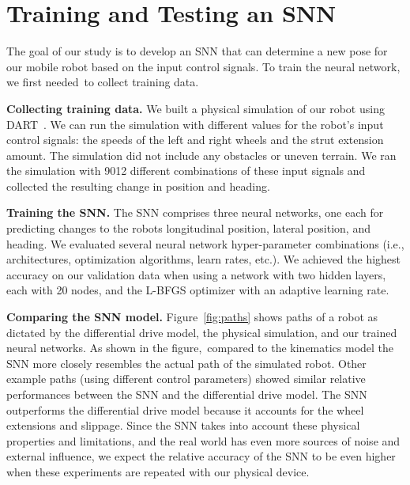 
\section{Training and Testing an SNN}

The goal of our study is to develop an SNN that can determine a new pose for our mobile robot based on the input control signals. To train the neural network, we first needed to collect training data.

\noindent
\textbf{Collecting training data.}
%
We built a physical simulation of our robot using DART~\citep{Lee.2018.JOSS.DARTDynamicAnimation}.
%
We can run the simulation with different values for the robot’s input control signals: the speeds of the left and right wheels and the strut extension amount. The simulation did not include any obstacles or uneven terrain.
%
We ran the simulation with 9012 different combinations of these input signals and collected the resulting change in position and heading.

\noindent
\textbf{Training the SNN.}
%
The SNN comprises three neural networks, one each for predicting changes to the robots longitudinal position, lateral position, and heading.
%
We evaluated several neural network hyper-parameter combinations (i.e., architectures, optimization algorithms, learn rates, etc.). We achieved the highest accuracy on our validation data when using a network with two hidden layers, each with 20 nodes, and the L-BFGS optimizer with an adaptive learning rate.

\noindent
\textbf{Comparing the SNN model.} Figure~\ref{fig:paths} shows paths of a robot as dictated by the differential drive model, the physical simulation, and our trained neural networks.
%
As shown in the figure, compared to the kinematics model the SNN more closely resembles the actual path of the simulated robot.
%
Other example paths (using different control parameters) showed similar relative performances between the SNN and the differential drive model.
%
The SNN outperforms the differential drive model because it accounts for the wheel extensions and slippage.
%
Since the SNN takes into account these physical properties and limitations, and the real world has even more sources of noise and external influence, we expect the relative accuracy of the SNN to be even higher when these experiments are repeated with our physical device.


